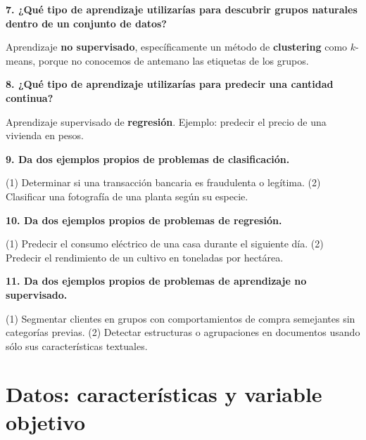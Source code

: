\documentclass[11pt]{article}
\newcommand{\pregunta}[1]{\vspace{2mm}\textbf{#1}}
\begin{document}
\pregunta{7. ¿Qué tipo de aprendizaje utilizarías para descubrir grupos naturales dentro de un conjunto de datos?}
\begin{respuesta}
Aprendizaje \textbf{no supervisado}, específicamente un método de \textbf{clustering} como $k$-means, porque no conocemos de antemano las etiquetas de los grupos.
\end{respuesta}

\pregunta{8. ¿Qué tipo de aprendizaje utilizarías para predecir una cantidad continua?}
\begin{respuesta}
Aprendizaje supervisado de \textbf{regresión}. Ejemplo: predecir el precio de una vivienda en pesos.
\end{respuesta}

\pregunta{9. Da dos ejemplos propios de problemas de clasificación.}
\begin{respuesta}
(1) Determinar si una transacción bancaria es fraudulenta o legítima. (2) Clasificar una fotografía de una planta según su especie.
\end{respuesta}

\pregunta{10. Da dos ejemplos propios de problemas de regresión.}
\begin{respuesta}
(1) Predecir el consumo eléctrico de una casa durante el siguiente día. (2) Predecir el rendimiento de un cultivo en toneladas por hectárea.
\end{respuesta}

\pregunta{11. Da dos ejemplos propios de problemas de aprendizaje no supervisado.}
\begin{respuesta}
(1) Segmentar clientes en grupos con comportamientos de compra semejantes sin categorías previas. (2) Detectar estructuras o agrupaciones en documentos usando sólo sus características textuales.
\end{respuesta}

\section{Datos: características y variable objetivo}
\end{document}
